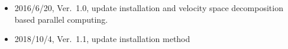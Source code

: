 \begin{itemize}
    \item 2016/6/20, Ver.~1.0, update installation and velocity space decomposition based parallel computing.
    \item 2018/10/4, Ver.~1.1, update installation method
\end{itemize}
%

